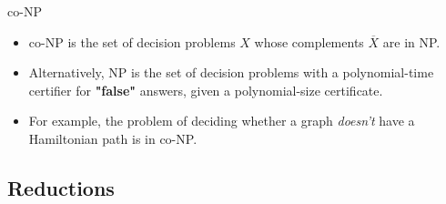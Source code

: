 \documentclass{beamer}
\begin{document}
\begin{frame}[t]{co-NP}
    \begin{itemize}
        \item \alert{co-NP} is the set of decision problems $X$ whose complements  $\overline{X}$ are in NP.
        \item Alternatively, NP is the set of decision problems with a polynomial-time certifier for \textbf{"false"} answers, given a polynomial-size certificate.
        \item For example, the problem of deciding whether a graph \emph{doesn't} have a Hamiltonian path is in co-NP.
    \end{itemize}
\end{frame}



\subsection{Reductions}
\end{document}
